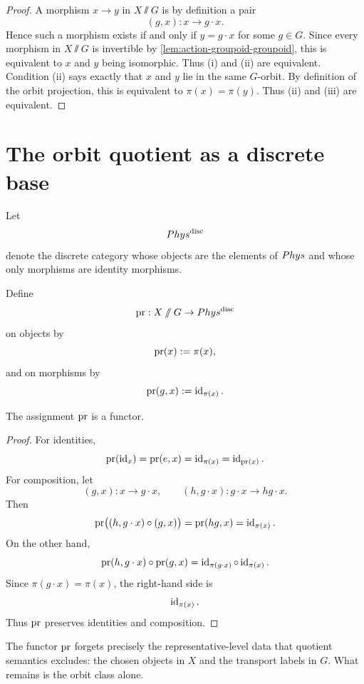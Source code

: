 \begin{proof}
	A morphism \(x\to y\) in \(X\sslash G\) is by definition a pair
	\[
		(g,x):x\to g\cdot x.
	\]
	Hence such a morphism exists if and only if \(y=g\cdot x\) for some
	\(g\in G\).  Since every morphism in \(X\sslash G\) is invertible by
	\cref{lem:action-groupoid-groupoid}, this is equivalent to \(x\) and
	\(y\) being isomorphic.  Thus \textup{(i)} and \textup{(ii)} are
	equivalent.
	Condition \textup{(ii)} says exactly that \(x\) and \(y\) lie in the
	same \(G\)-orbit.  By definition of the orbit projection, this is
	equivalent to \(\pi(x)=\pi(y)\).  Thus \textup{(ii)} and \textup{(iii)}
	are equivalent.
\end{proof}
\section{The orbit quotient as a discrete base}
\begin{definition}
	\label{def:phys-disc}
	Let
	\[
		Phys^{\mathrm{disc}}
	\]
	denote the discrete category whose objects are the elements of
	\(Phys\) and whose only morphisms are identity morphisms.
\end{definition}
\begin{definition}
	Define
	\[
		\operatorname{pr}:X\mathbin{/\mkern-6mu/} G\to Phys^{\mathrm{disc}}
	\]
	on objects by
	\[
		\operatorname{pr}(x):=\pi(x),
	\]
	and on morphisms by
	\[
		\operatorname{pr}(g,x):=\operatorname{id}_{\pi(x)}.
	\]
\end{definition}
\begin{lemma}
	The assignment \(\operatorname{pr}\) is a functor.
\end{lemma}
\begin{proof}
	For identities,
	\[
		\operatorname{pr}(\operatorname{id}_x)=\operatorname{pr}(e,x)=\operatorname{id}_{\pi(x)}=\operatorname{id}_{\operatorname{pr}(x)}.
	\]
	For composition, let
	\[
		(g,x):x\to g\cdot x,
		\qquad
		(h,g\cdot x):g\cdot x\to hg\cdot x.
	\]
	Then
	\[
		\operatorname{pr}\bigl((h,g\cdot x)\circ(g,x)\bigr)
		=
		\operatorname{pr}(hg,x)
		=
		\operatorname{id}_{\pi(x)}.
	\]
	On the other hand,
	\[
		\operatorname{pr}(h,g\cdot x)\circ \operatorname{pr}(g,x)
		=
		\operatorname{id}_{\pi(g\cdot x)}\circ \operatorname{id}_{\pi(x)}.
	\]
	Since \(\pi(g\cdot x)=\pi(x)\), the right-hand side is
	\[
		\operatorname{id}_{\pi(x)}.
	\]
	Thus \(\operatorname{pr}\) preserves identities and composition.
\end{proof}
\begin{remark}
	The functor \(\operatorname{pr}\) forgets precisely the representative-level data that
	quotient semantics excludes: the chosen objects in \(X\) and the
	transport labels in \(G\).  What remains is the orbit class alone.
\end{remark}
